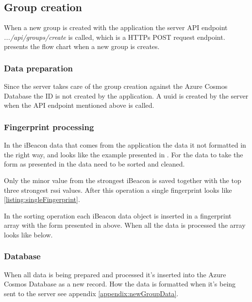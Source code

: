 \subsection{Group creation}\label{sec:implServerGroupCreation}
When a new group is created with the application the server API endpoint \textit{.../api/groups/create} is called, which is a HTTPs POST request \cite{POSTHTTPMDN} endpoint.
 presents the flow chart when a new group is creates.


\subsubsection{Data preparation}\label{sec:implServerGroupCreationDataPrep}
Since the server takes care of the group creation against the Azure Cosmos Database \cite{IntroductionAzureCosmos} the ID is not created by the application.
A \acrfull{uuid} \cite{CommonsIdUUID} is created by the server when the API endpoint mentioned above is called.

\subsubsection{Fingerprint processing}\label{sec:implServerGroupCreationFingerprint}

In the iBeacon data that comes from the application the data it not formatted in the right way, and looks like the example presented in .
For the data to take the form as presented in  the data need to be sorted and cleaned.


Only the minor value from the strongest iBeacon is saved together with the top three strongest \acrshort{rssi} values. After this operation a single fingerprint looks like \cref{listing:singleFingerprint}.


In the sorting operation each iBeacon data object is inserted in a fingerprint array with the form presented in  above.
When all the data is processed the array looks like  below.



\subsubsection{Database}\label{sec:implServerGroupCreationDatabase}
When all data is being prepared and processed it's inserted into the Azure Cosmos Database as a new record.
How the data is formatted when it's being sent to the server see appendix \ref{appendix:newGroupData}.
